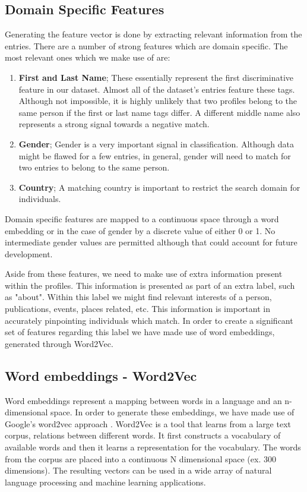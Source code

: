 \subsection{Domain Specific Features}
\label{sub-sec:domain-specific-features}
Generating the feature vector is done by extracting relevant information from
the entries. There are a number of strong features which are domain specific.
The most relevant ones which we make use of are:
\begin{enumerate}
  \item \textbf{First and Last Name}; These essentially represent the first discriminative
    feature in our dataset. Almost all of the dataset's entries feature these
    tags. Although not impossible, it is highly unlikely that two profiles
    belong to the same person if the first or last name tags differ. A different
    middle name also represents a strong signal towards a negative match.
  \item \textbf{Gender}; Gender is a very important signal in classification.
    Although data might be flawed for a few entries, in general, gender will
    need to match for two entries to belong to the same person.
  \item \textbf{Country}; A matching country is important to restrict the
    search domain for individuals.
\end{enumerate}

Domain specific features are mapped to a continuous space through a word
embedding or in the case of gender by a discrete value of either 0 or 1. No
intermediate gender values are permitted although that could account for future
development.

Aside from these features, we need to make use of extra information present
within the profiles. This information is presented as part of an extra label,
such as "about". Within this label we might find relevant interests of a person,
publications, events, places related, etc. This information is important in
accurately pinpointing individuals which match. In order to create a significant
set of features regarding this label we have made use of word embeddings, generated
through Word2Vec.

\subsection{Word embeddings - Word2Vec}
\label{sub-sec:word-embeddings}
Word embeddings represent a mapping between words in a language and an n-dimensional
space. In order to generate these embeddings, we have made use of Google's word2vec
approach \cite{mikolov2013distributed}. Word2Vec is a tool that learns from a large
text corpus, relations between different words. It first constructs a vocabulary
of available words and then it learns a representation for the vocabulary.
The words from the corpus are placed into a continuous N dimensional space
(ex. 300 dimensions). The resulting vectors can be used in a wide array of
natural language processing and machine learning applications.

